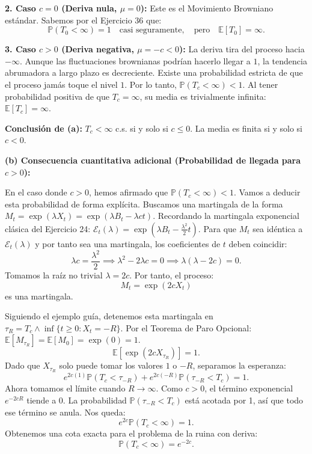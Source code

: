 \documentclass[11pt, letterpaper]{article}
\begin{document}
\begin{solucion}
    \textbf{2. Caso $c = 0$ (Deriva nula, $\mu = 0$):}
    Este es el Movimiento Browniano estándar. Sabemos por el Ejercicio 36 que:
    \[ \mathbb{P}(T_0 < \infty) = 1 \quad \text{casi seguramente}, \quad \text{pero} \quad \mathbb{E}[T_0] = \infty. \]

    \textbf{3. Caso $c > 0$ (Deriva negativa, $\mu = -c < 0$):}
    La deriva tira del proceso hacia $-\infty$. Aunque las fluctuaciones brownianas podrían hacerlo llegar a $1$, la tendencia abrumadora a largo plazo es decreciente. Existe una probabilidad estricta de que el proceso jamás toque el nivel $1$.
    Por lo tanto, $\mathbb{P}(T_c < \infty) < 1$. 
    Al tener probabilidad positiva de que $T_c = \infty$, su media es trivialmente infinita: $\mathbb{E}[T_c] = \infty$.

    \textbf{Conclusión de (a):} $T_c < \infty$ c.s. si y solo si $c \le 0$. La media es finita si y solo si $c < 0$.

    \vspace{3mm}
    \textbf{(b) Consecuencia cuantitativa adicional (Probabilidad de llegada para $c > 0$):}

    En el caso donde $c > 0$, hemos afirmado que $\mathbb{P}(T_c < \infty) < 1$. Vamos a deducir esta probabilidad de forma explícita.
    Buscamos una martingala de la forma $M_t = \exp(\lambda X_t) = \exp(\lambda B_t - \lambda c t)$.
    Recordando la martingala exponencial clásica del Ejercicio 24: $\mathcal{E}_t(\lambda) = \exp(\lambda B_t - \frac{\lambda^2}{2}t)$.
    Para que $M_t$ sea idéntica a $\mathcal{E}_t(\lambda)$ y por tanto sea una martingala, los coeficientes de $t$ deben coincidir:
    \[ \lambda c = \frac{\lambda^2}{2} \implies \lambda^2 - 2\lambda c = 0 \implies \lambda(\lambda - 2c) = 0. \]
    Tomamos la raíz no trivial $\lambda = 2c$. Por tanto, el proceso:
    \[ M_t = \exp(2c X_t) \]
    es una martingala.
    
    Siguiendo el ejemplo guía, detenemos esta martingala en $\tau_R = T_c \wedge \inf\{t \ge 0 : X_t = -R\}$.
    Por el Teorema de Paro Opcional: $\mathbb{E}[M_{\tau_R}] = \mathbb{E}[M_0] = \exp(0) = 1$.
    \[ \mathbb{E}[\exp(2c X_{\tau_R})] = 1. \]
    Dado que $X_{\tau_R}$ solo puede tomar los valores $1$ o $-R$, separamos la esperanza:
    \[ e^{2c(1)} \mathbb{P}(T_c < \tau_{-R}) + e^{2c(-R)} \mathbb{P}(\tau_{-R} < T_c) = 1. \]
    Ahora tomamos el límite cuando $R \to \infty$. Como $c > 0$, el término exponencial $e^{-2cR}$ tiende a $0$. La probabilidad $\mathbb{P}(\tau_{-R} < T_c)$ está acotada por 1, así que todo ese término se anula.
    Nos queda:
    \[ e^{2c} \mathbb{P}(T_c < \infty) = 1. \]
   Obtenemos una cota exacta para el problema de la ruina con deriva:
    \[ \mathbb{P}(T_c < \infty) = e^{-2c}. \]
\end{solucion}
\end{document}
